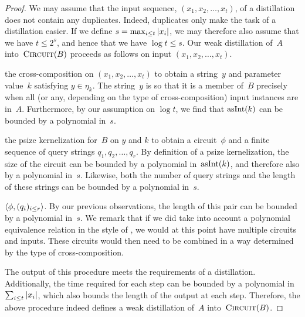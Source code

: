 \begin{proof}
  We may assume that the input sequence, $(x_1, x_2, \ldots, x_t)$, of a distillation does not contain any duplicates.
  Indeed, duplicates only make the task of a distillation easier.
  If we define $s = \max_{i \le t} {\lvert x_i\rvert}$, we may therefore also assume that we have $t \le 2^s$, and hence that we have $\log t \le s$.
  Our weak distillation of~$A$ into~$\textnormal{\textsc{Circuit}}(B)$ proceeds as follows on input $(x_1, x_2, \ldots, x_t)$.
  \begin{codelisting}
  \item
     the cross-composition on $(x_1, x_2, \ldots, x_t)$ to obtain a string~$y$ and parameter value~$k$ satisfying $y \in \eta_k$.
    The string~$y$ is so that it is a member of~$B$ precisely when all (or any, depending on the type of cross-composition) input instances are in~$A$.
    Furthermore, by our assumption on $\log t$, we find that $\asNat(k)$ can be bounded by a polynomial in~$s$.
  \item
     the psize kernelization for~$B$ on $y$ and $k$ to obtain a circuit~$\phi$ and a finite sequence of query strings $q_1, q_2, \ldots, q_r$.
    By definition of a psize kernelization, the size of the circuit can be bounded by a polynomial in~$\asNat(k)$, and therefore also by a polynomial in~$s$.
    Likewise, both the number of query strings and the length of these strings can be bounded by a polynomial in~$s$.
  \item
     $\pair{\phi}{(q_i)_{i \le r}}$.
    By our previous observations, the length of this pair can be bounded by a polynomial in~$s$.
    We remark that if we did take into account a polynomial equivalence relation in the style of \textcite{bodlaender2014kernelization}, we would at this point have multiple circuits and inputs.
    These circuits would then need to be combined in a way determined by the type of cross-composition.
  \end{codelisting}

  The output of this procedure meets the requirements of a distillation.
  Additionally, the time required for each step can be bounded by a polynomial in $\sum_{i \le t} {\lvert x_i\rvert}$, which also bounds the length of the output at each step.
  Therefore, the above procedure indeed defines a weak distillation of~$A$ into~$\textnormal{\textsc{Circuit}}(B)$.
\end{proof}

